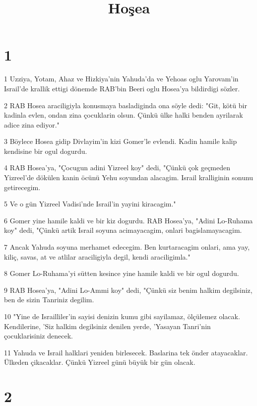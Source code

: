 

\title{Hoşea}


\chapter{1}

\par 1 Uzziya, Yotam, Ahaz ve Hizkiya'nin Yahuda'da ve Yehoas oglu Yarovam'in Israil'de krallik ettigi dönemde RAB'bin Beeri oglu Hosea'ya bildirdigi sözler.
\par 2 RAB Hosea araciligiyla konusmaya basladiginda ona söyle dedi: "Git, kötü bir kadinla evlen, ondan zina çocuklarin olsun. Çünkü ülke halki benden ayrilarak adice zina ediyor."
\par 3 Böylece Hosea gidip Divlayim'in kizi Gomer'le evlendi. Kadin hamile kalip kendisine bir ogul dogurdu.
\par 4 RAB Hosea'ya, "Çocugun adini Yizreel koy" dedi, "Çünkü çok geçmeden Yizreel'de dökülen kanin öcünü Yehu soyundan alacagim. Israil kralliginin sonunu getirecegim.
\par 5 Ve o gün Yizreel Vadisi'nde Israil'in yayini kiracagim."
\par 6 Gomer yine hamile kaldi ve bir kiz dogurdu. RAB Hosea'ya, "Adini Lo-Ruhama koy" dedi, "Çünkü artik Israil soyuna acimayacagim, onlari bagislamayacagim.
\par 7 Ancak Yahuda soyuna merhamet edecegim. Ben kurtaracagim onlari, ama yay, kiliç, savas, at ve atlilar araciligiyla degil, kendi araciligimla."
\par 8 Gomer Lo-Ruhama'yi sütten kesince yine hamile kaldi ve bir ogul dogurdu.
\par 9 RAB Hosea'ya, "Adini Lo-Ammi koy" dedi, "Çünkü siz benim halkim degilsiniz, ben de sizin Tanriniz degilim.
\par 10 "Yine de Israilliler'in sayisi denizin kumu gibi sayilamaz, ölçülemez olacak. Kendilerine, 'Siz halkim degilsiniz denilen yerde, 'Yasayan Tanri'nin çocuklarisiniz denecek.
\par 11 Yahuda ve Israil halklari yeniden birlesecek. Baslarina tek önder atayacaklar. Ülkeden çikacaklar. Çünkü Yizreel günü büyük bir gün olacak.

\chapter{2}

